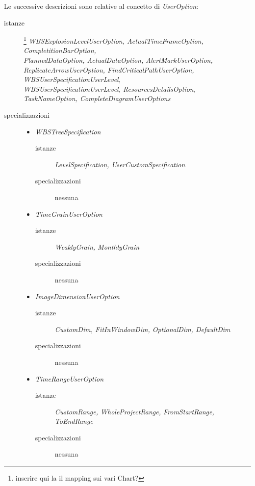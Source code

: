 Le successive descrizioni sono relative al concetto di \emph{UserOption}:
\begin{description}
  \item[istanze]\footnote{inserire qui la il mapping sui vari Chart?}
  \emph{WBSExplosionLevelUserOption, ActualTimeFrameOption, CompletitionBarOption, \\ PlannedDataOption, ActualDataOption,
  AlertMarkUserOption, ReplicateArrowUserOption, FindCriticalPathUserOption,
  WBSUserSpecificationUserLevel, \\WBSUserSpecificationUserLevel,
  ResourcesDetailsOption, TaskNameOption, CompleteDiagramUserOptions}
  \item[specializzazioni] \quad
  \begin{itemize}
    \item \emph{WBSTreeSpecification}
    \begin{description}
  \item[istanze] \emph{LevelSpecification, UserCustomSpecification}
  \item[specializzazioni] nessuna
\end{description}

\item \emph{TimeGrainUserOption}
    \begin{description}
  \item[istanze] \emph{WeaklyGrain, MonthlyGrain}
  \item[specializzazioni] nessuna
\end{description}

\item \emph{ImageDimensionUserOption}
    \begin{description}
  \item[istanze] \emph{CustomDim, FitInWindowDim, OptionalDim, DefaultDim}
  \item[specializzazioni] nessuna
\end{description}

\item \emph{TimeRangeUserOption}
    \begin{description}
  \item[istanze] \emph{CustomRange, WholeProjectRange, FromStartRange, ToEndRange}
  \item[specializzazioni] nessuna
\end{description}

  \end{itemize}
\end{description}

